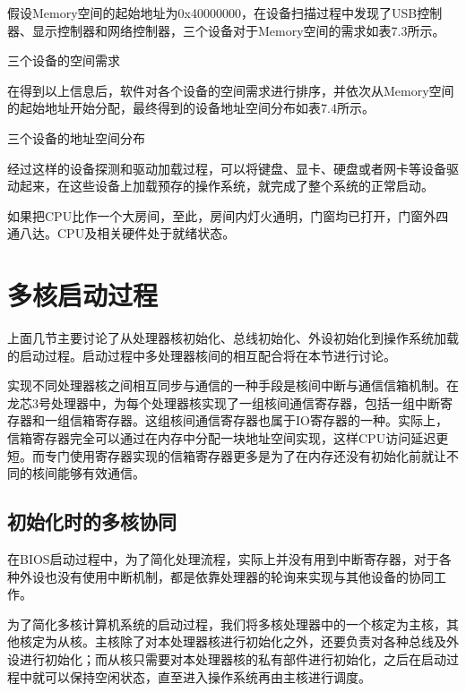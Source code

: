 \documentclass[]{ctexbook}
\begin{document}
假设Memory空间的起始地址为0x40000000，在设备扫描过程中发现了USB控制器、显示控制器和网络控制器，三个设备对于Memory空间的需求如表7.3所示。

\label{tab:space-requirement}三个设备的空间需求

在得到以上信息后，软件对各个设备的空间需求进行排序，并依次从Memory空间的起始地址开始分配，最终得到的设备地址空间分布如表7.4所示。

\label{tab:space-allocation}三个设备的地址空间分布

经过这样的设备探测和驱动加载过程，可以将键盘、显卡、硬盘或者网卡等设备驱动起来，在这些设备上加载预存的操作系统，就完成了整个系统的正常启动。

如果把CPU比作一个大房间，至此，房间内灯火通明，门窗均已打开，门窗外四通八达。CPU及相关硬件处于就绪状态。

\hypertarget{ux591aux6838ux542fux52a8ux8fc7ux7a0b}{%
\section{多核启动过程}\label{ux591aux6838ux542fux52a8ux8fc7ux7a0b}}

上面几节主要讨论了从处理器核初始化、总线初始化、外设初始化到操作系统加载的启动过程。启动过程中多处理器核间的相互配合将在本节进行讨论。

实现不同处理器核之间相互同步与通信的一种手段是核间中断与通信信箱机制。在龙芯3号处理器中，为每个处理器核实现了一组核间通信寄存器，包括一组中断寄存器和一组信箱寄存器。这组核间通信寄存器也属于IO寄存器的一种。实际上，信箱寄存器完全可以通过在内存中分配一块地址空间实现，这样CPU访问延迟更短。而专门使用寄存器实现的信箱寄存器更多是为了在内存还没有初始化前就让不同的核间能够有效通信。

\hypertarget{ux521dux59cbux5316ux65f6ux7684ux591aux6838ux534fux540c}{%
\subsection{初始化时的多核协同}\label{ux521dux59cbux5316ux65f6ux7684ux591aux6838ux534fux540c}}

在BIOS启动过程中，为了简化处理流程，实际上并没有用到中断寄存器，对于各种外设也没有使用中断机制，都是依靠处理器的轮询来实现与其他设备的协同工作。

为了简化多核计算机系统的启动过程，我们将多核处理器中的一个核定为主核，其他核定为从核。主核除了对本处理器核进行初始化之外，还要负责对各种总线及外设进行初始化；而从核只需要对本处理器核的私有部件进行初始化，之后在启动过程中就可以保持空闲状态，直至进入操作系统再由主核进行调度。
\end{document}
